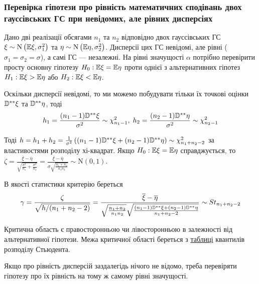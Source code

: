 \subsubsection*{Перевірка гіпотези про рівність математичних сподівань двох 
гауссівських ГС при невідомих, але рівних дисперсіях}

Дано дві реалізації обсягами $n_1$ та $n_2$ відповідно двох гауссівських ГС
$\xi \sim \mathrm{N}\left(\mathbb{E} \xi, \sigma_1^2\right)$ та $\eta \sim \mathrm{N}\left(\mathbb{E} \eta, \sigma_2^2\right)$.
Дисперсії цих ГС невідомі, але рівні ($\sigma_1 = \sigma_2 = \sigma$), а самі ГС --- незалежні. На рівні значущості $\alpha$ потрібно перевірити 
просту основну гіпотезу $H_0 : \mathbb{E} \xi = \mathbb{E} \eta$ проти однієї з альтернативних 
гіпотез $H_1 : \mathbb{E} \xi > \mathbb{E} \eta$ або $H_2 : \mathbb{E} \xi < \mathbb{E} \eta$.

Оскільки дисперсії невідомі, то ми можемо побудувати тільки їх точкові оцінки $\mathbb{D}^{**}\xi$ та
$\mathbb{D}^{**}\eta$, тоді
$$h_1 = \frac{(n_1 - 1)\mathbb{D}^{**}\xi}{\sigma^2} \sim \chi^2_{n_1 - 1}, \; h_2 = \frac{(n_2 - 1)\mathbb{D}^{**}\eta}{\sigma^2} \sim \chi^2_{n_2 - 1}$$

Тоді $h = h_1 + h_2 = \frac{1}{\sigma^2}\left((n_1-1)\mathbb{D}^{**}\xi + (n_2-1)\mathbb{D}^{**}\eta\right) \sim \chi_{n_1 + n_2 - 2}^2$ за властивостями розподілу хі-квадрат.
Якщо $H_0: \mathbb{E}\xi = \mathbb{E}\eta$ справджується, то 
$\zeta = \frac{\overline{\xi} - \overline{\eta}}{\sqrt{\frac{\sigma^2}{n_1} + \frac{\sigma^2}{n_2}}} =
\frac{\overline{\xi} - \overline{\eta}}{\sigma\sqrt{\frac{n_1 + n_2}{n_1 n_2}}} \sim \mathrm{N}(0, 1)$.

В якості статистики критерію береться
$$\gamma = \frac{\zeta}{\sqrt{h/(n_1 + n_2 - 2)}} = 
\frac{\overline{\xi} - \overline{\eta}}
{\sqrt{\frac{n_1 + n_2}{n_1 n_2}}
\sqrt{\frac{(n_1 - 1)\mathbb{D}^{**}\xi + (n_2 - 1)\mathbb{D}^{**}\eta}{n_1 + n_2 - 2}}} 
\sim {St}_{n_1 + n_2 - 2}$$

Критична область є правосторонньою чи лівосторонньою в залежності від альтернативної гіпотези.
Межа критичної області береться з \hyperref[table:student]{таблиці} квантилів розподілу Стьюдента. 
\begin{remark}
    Якщо про рівність дисперсій заздалегідь нічого не відомо, треба перевіряти гіпотезу про їх рівність
    на тому ж самому рівні значущості.
\end{remark}

